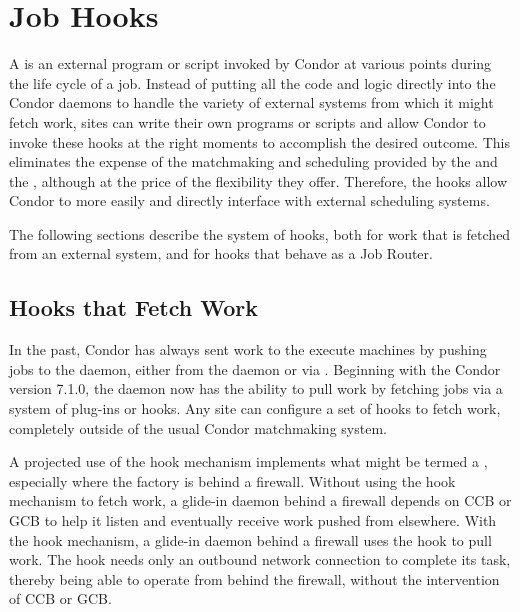\section{\label{sec:job-hooks}Job Hooks}

A  is an external program or script invoked by Condor at various
points during the life cycle of a job.
Instead of putting all the code and logic directly into the Condor
daemons to handle the variety of external systems from which it
might fetch work,
sites can write their own programs or scripts and allow
Condor to invoke these hooks at the right moments to accomplish the
desired outcome.
This eliminates the expense of the matchmaking and 
scheduling provided by the  and
the , although at the price of the flexibility
they offer.
Therefore, the hooks allow Condor to more easily and directly interface with
external scheduling systems.


The following sections describe the system of hooks,
both for work that is fetched from an external system,
and for hooks that behave as a Job Router.


\subsection{\label{sec:job-hooks-overview}
Hooks that Fetch Work}

In the past, Condor has always sent work to the execute machines by
pushing jobs to the  daemon, either from the 
daemon or via .
Beginning with the Condor version 7.1.0, the  daemon now has the
ability to pull work by fetching jobs via a system of plug-ins or
hooks.
Any site can configure a set of hooks to fetch work, completely
outside of the usual Condor matchmaking system.

A projected use of the hook mechanism implements what might
be termed a , especially where the
factory is behind a firewall.
Without using the hook mechanism to fetch work,
a glide-in  daemon behind a firewall
depends on CCB or GCB to help it listen and eventually receive
work pushed from elsewhere.
With the hook mechanism, a glide-in  daemon
behind a firewall uses the hook to pull work.
The hook needs only an outbound network connection to complete
its task,
thereby being able to operate from behind the firewall,
without the intervention of CCB or GCB.

